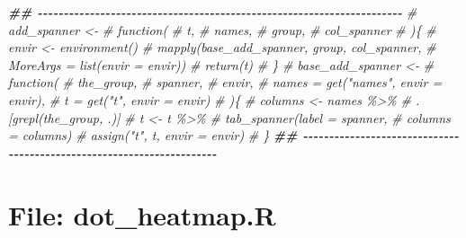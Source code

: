 \documentclass[
]{article}
\newenvironment{Shaded}{\begin{snugshade}}{\end{snugshade}}
\newcommand{\CommentTok}[1]{\textcolor[rgb]{0.56,0.35,0.01}{\textit{#1}}}
\newcommand{\DocumentationTok}[1]{\textcolor[rgb]{0.56,0.35,0.01}{\textbf{\textit{#1}}}}
\begin{document}
\begin{Shaded}
\begin{Highlighting}[]
\DocumentationTok{\#\# {-}{-}{-}{-}{-}{-}{-}{-}{-}{-}{-}{-}{-}{-}{-}{-}{-}{-}{-}{-}{-}{-}{-}{-}{-}{-}{-}{-}{-}{-}{-}{-}{-}{-}{-}{-}{-}{-}{-}{-}{-}{-}{-}{-}{-}{-}{-}{-}{-}{-}{-}{-}{-}{-}{-}{-}{-}{-}{-}{-}{-}{-}{-}{-}{-}{-}{-}{-}{-}{-} }
\CommentTok{\# add\_spanner \textless{}{-} }
\CommentTok{\#   function(}
\CommentTok{\#            t,}
\CommentTok{\#            names,}
\CommentTok{\#            group,}
\CommentTok{\#            col\_spanner}
\CommentTok{\#            )\{}
\CommentTok{\#     envir \textless{}{-} environment()}
\CommentTok{\#     mapply(base\_add\_spanner, group, col\_spanner,}
\CommentTok{\#            MoreArgs = list(envir = envir))}
\CommentTok{\#     return(t)}
\CommentTok{\#   \}}
\CommentTok{\# base\_add\_spanner \textless{}{-} }
\CommentTok{\#   function(}
\CommentTok{\#            the\_group,}
\CommentTok{\#            spanner,}
\CommentTok{\#            envir,}
\CommentTok{\#            names = get("names", envir = envir),}
\CommentTok{\#            t = get("t", envir = envir)}
\CommentTok{\#            )\{}
\CommentTok{\#     columns \textless{}{-} names \%\textgreater{}\%}
\CommentTok{\#       .[grepl(the\_group, .)]}
\CommentTok{\#     t \textless{}{-} t \%\textgreater{}\%}
\CommentTok{\#       tab\_spanner(label = spanner,}
\CommentTok{\#                   columns = columns)}
\CommentTok{\#     assign("t", t, envir = envir)}
\CommentTok{\#   \}}
\DocumentationTok{\#\# {-}{-}{-}{-}{-}{-}{-}{-}{-}{-}{-}{-}{-}{-}{-}{-}{-}{-}{-}{-}{-}{-}{-}{-}{-}{-}{-}{-}{-}{-}{-}{-}{-}{-}{-}{-}{-}{-}{-}{-}{-}{-}{-}{-}{-}{-}{-}{-}{-}{-}{-}{-}{-}{-}{-}{-}{-}{-}{-}{-}{-}{-}{-}{-}{-}{-}{-}{-}{-}{-} }
\end{Highlighting}
\end{Shaded}

\hypertarget{file-dot_heatmap.r}{%
\section{File: dot\_heatmap.R}\label{file-dot_heatmap.r}}
\end{document}
